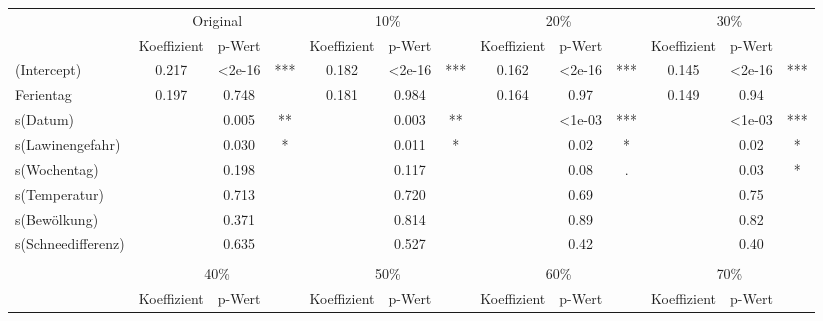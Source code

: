 \documentclass[12pt]{scrreprt}
\begin{document}
\begin{table}[H]
	\vspace{-0.5cm}
	\centering
	\begin{adjustbox}{max width=\textwidth}
	\begin{tabular}{l|ccc|ccc|ccc|ccc|}
		\multicolumn{1}{r}{} & \multicolumn{3}{c}{Original} & \multicolumn{3}{c}{10\%} & \multicolumn{3}{c}{20\%} & \multicolumn{3}{c}{30\%} \\
		& Koeffizient & p-Wert &       & Koeffizient & p-Wert &       & Koeffizient & p-Wert &       & Koeffizient & p-Wert & \multicolumn{1}{c}{} \\
		\cmidrule{2-13}    (Intercept) & 0.217 & <2e-16 & ***   & 0.182 & <2e-16 & ***   & 0.162 & <2e-16 & ***   & 0.145 & <2e-16 & *** \\
		Ferientag & 0.197 & 0.748 &       & 0.181 & 0.984 &       & 0.164 & 0.97  &       & 0.149 & 0.94  &   \\
		s(Datum) &       & 0.005 & **    &       & 0.003 & **    &       & <1e-03 & ***   &       & <1e-03 & *** \\
		s(Lawinengefahr) &       & 0.030 & *     &       & 0.011 & *     &       & 0.02  & *     &       & 0.02  & * \\
		s(Wochentag) &       & 0.198 &       &       & 0.117 &       &       & 0.08  & .     &       & 0.03  & * \\
		s(Temperatur) &       & 0.713 &       &       & 0.720 &       &       & 0.69  &       &       & 0.75  &   \\
		s(Bewölkung) &       & 0.371 &       &       & 0.814 &       &       & 0.89  &       &       & 0.82  &   \\
		s(Schneedifferenz) &       & 0.635 &       &       & 0.527 &       &       & 0.42  &       &       & 0.40  &   \\
		\cmidrule{2-13}    \multicolumn{1}{r}{} &       &       & \multicolumn{1}{c}{} &       &       & \multicolumn{1}{c}{} &       &       & \multicolumn{1}{c}{} &       &       & \multicolumn{1}{c}{} \\
		\multicolumn{1}{r}{} & \multicolumn{3}{c}{40\%} & \multicolumn{3}{c}{50\%} & \multicolumn{3}{c}{60\%} & \multicolumn{3}{c}{70\%} \\
		& Koeffizient & p-Wert &       & Koeffizient & p-Wert &       & Koeffizient & p-Wert &       & Koeffizient & p-Wert & \multicolumn{1}{c}{} \\

\end{tabular}
\end{adjustbox}
\end{table}
\end{document}
